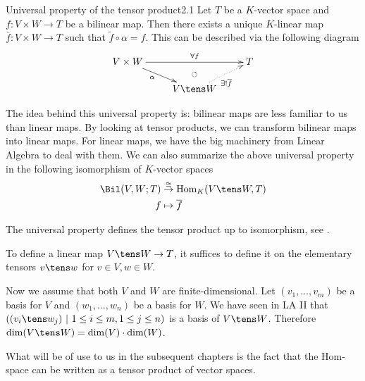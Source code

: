 \documentclass[twoside = false,	%
		headsepline,		%
		parskip = true,
		]{scrbook}						%
\begin{document}
    \begin{proposition}{Universal property of the tensor product}{2.1}
        Let $T$ be a $K$-vector space and $f: V \times W \to T$ be a bilinear map. Then there exists a unique $K$-linear map $\overline{f}: V\times W \to T$ such that $\tilde{f} \circ \alpha = f$. This can be described via the following diagram
        \begin{equation*}
            \xymatrix@R=14pt {
                V \times W \ar[dr]_(.4){\alpha} \ar[rr]^(.55){\forall f} & & T \\
                & V \tens W\ar@{.>}[ur]_{\exists! \bar{f}} \ar@{}[u]|(.55){\circlearrowleft}}
        \end{equation*}
    \end{proposition}
    The idea behind this universal property is: bilinear maps are less familiar to us than linear maps. By looking at tensor products, we can transform bilinear maps into linear maps. For linear maps, we have the big machinery from Linear Algebra to deal with them. We can also summarize the above universal property in the following isomorphism of $K$-vector spaces
    \begin{equation*}
        \begin{split}
            \Bil(V,W;T) &\overset{\cong}{\to} \Hom_K(V \tens W, T) \\
            f &\mapsto \bar{f}            
        \end{split}
      \end{equation*}
    
    \begin{remark*}{}
        The universal property defines the tensor product up to isomorphism, see \cite{LA}.
    \end{remark*}
    
    To define a linear map $V \tens W \to T$, it suffices to define it on the elementary tensors $v \tens w$ for $v \in V,w \in W$.
    
    Now we assume that both $V$ and $W$ are finite-dimensional. Let $(v_1,\dots,v_m)$ be a basis for $V$ and $(w_1,\dots,w_n)$ be a basis for $W$. We have seen in LA II \cite{LA} that $\round{(v_i \tens w_j) \ | \ 1 \leq i \leq m, 1 \leq j \leq n}$ is a basis of $V \tens W$. Therefore $\dim(V \tens W) = \dim(V) \cdot \dim(W)$.
    
    What will be of use to us in the subsequent chapters is the fact that the Hom-space can be written as a tensor product of vector spaces.
    
\end{document}
